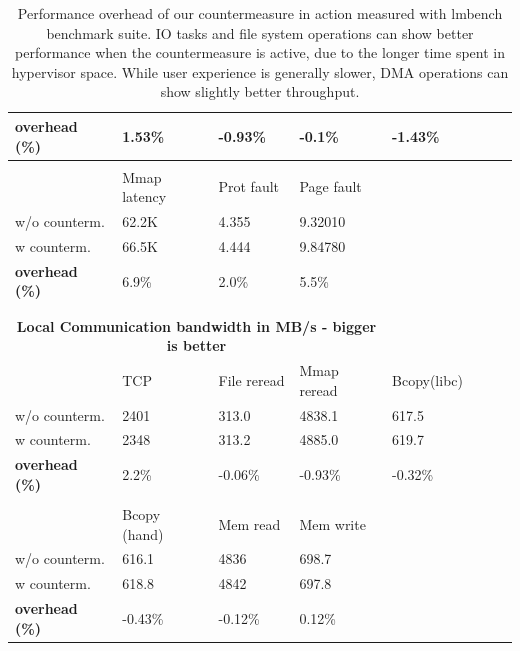 \begin{center}
\begin{table}
\begin{tabular}{|l|l|l|l|l|l|l|l|}
\hline
\bf{overhead (\%)}  & 1.53\%            & -0.93\%          &  -0.1\%              & -1.43\%              \\ \hline
\multicolumn{3}{|c|}{\bf{  }} \\ \hline
		      & Mmap latency & Prot fault &  Page fault  & \\ \hline
w/o counterm. &  62.2K             & 4.355       & 9.32010 &\\
w counterm.    & 66.5K              & 4.444       & 9.84780 &\\
\hline
\bf{overhead (\%)} & 6.9\%               &  2.0\%     &  5.5\% & \\ \hline
\\
\\
\hline


\multicolumn{4}{|c|}{\bf{Local Communication bandwidth in MB/s - bigger is better}} & \\ \hline
	                          & TCP  &  File reread   &  Mmap reread & Bcopy(libc)   \\ \hline
w/o counterm.            & 2401 & 313.0            & 4838.1             &  617.5           \\
w counterm.               & 2348 & 313.2            & 4885.0             & 619.7            \\
\hline
\bf{overhead (\%)}     & 2.2\% & -0.06\%         & -0.93\%           &  -0.32\%         \\ \hline
\multicolumn{3}{|c|}{\bf{  }} \\ \hline
				& Bcopy (hand) & Mem read  &  Mem write &\\ \hline
w/o counterm. 		& 616.1              & 4836          &  698.7 &\\
w counterm.		& 618.8              & 4842          & 697.8  &\\
\hline				
\bf{overhead (\%)}  	&  -0.43\%         &  -0.12\%    & 0.12\% & \\ \hline
\end{tabular}
\caption{Performance overhead of our countermeasure in action measured with lmbench benchmark suite. IO tasks and file system operations can show better performance when the countermeasure is active, due to the longer time spent in hypervisor space. While user experience is generally slower, DMA operations can show slightly better throughput.}
\label{microbench}
\end{table}



\end{center}
